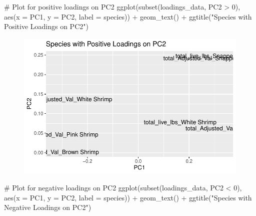 \documentclass[
  letterpaper,
  DIV=11,
  numbers=noendperiod]{scrartcl}
\newenvironment{Shaded}{\begin{snugshade}}{\end{snugshade}}
\newcommand{\AttributeTok}[1]{\textcolor[rgb]{0.40,0.45,0.13}{#1}}
\newcommand{\CommentTok}[1]{\textcolor[rgb]{0.37,0.37,0.37}{#1}}
\newcommand{\DecValTok}[1]{\textcolor[rgb]{0.68,0.00,0.00}{#1}}
\newcommand{\FunctionTok}[1]{\textcolor[rgb]{0.28,0.35,0.67}{#1}}
\newcommand{\NormalTok}[1]{\textcolor[rgb]{0.00,0.23,0.31}{#1}}
\newcommand{\SpecialCharTok}[1]{\textcolor[rgb]{0.37,0.37,0.37}{#1}}
\newcommand{\StringTok}[1]{\textcolor[rgb]{0.13,0.47,0.30}{#1}}
\begin{document}
\begin{Shaded}
\begin{Highlighting}[]
\CommentTok{\# Plot for positive loadings on PC2}
\FunctionTok{ggplot}\NormalTok{(}\FunctionTok{subset}\NormalTok{(loadings\_data, PC2 }\SpecialCharTok{\textgreater{}} \DecValTok{0}\NormalTok{), }\FunctionTok{aes}\NormalTok{(}\AttributeTok{x =}\NormalTok{ PC1, }\AttributeTok{y =}\NormalTok{ PC2, }\AttributeTok{label =}\NormalTok{ species)) }\SpecialCharTok{+}
  \FunctionTok{geom\_text}\NormalTok{() }\SpecialCharTok{+}
  \FunctionTok{ggtitle}\NormalTok{(}\StringTok{"Species with Positive Loadings on PC2"}\NormalTok{)}
\end{Highlighting}
\end{Shaded}

\begin{figure}[H]

{\centering \includegraphics{PCA_all_data_files/figure-pdf/unnamed-chunk-8-3.pdf}

}

\end{figure}

\begin{Shaded}
\begin{Highlighting}[]
\CommentTok{\# Plot for negative loadings on PC2}
\FunctionTok{ggplot}\NormalTok{(}\FunctionTok{subset}\NormalTok{(loadings\_data, PC2 }\SpecialCharTok{\textless{}} \DecValTok{0}\NormalTok{), }\FunctionTok{aes}\NormalTok{(}\AttributeTok{x =}\NormalTok{ PC1, }\AttributeTok{y =}\NormalTok{ PC2, }\AttributeTok{label =}\NormalTok{ species)) }\SpecialCharTok{+}
  \FunctionTok{geom\_text}\NormalTok{() }\SpecialCharTok{+}
  \FunctionTok{ggtitle}\NormalTok{(}\StringTok{"Species with Negative Loadings on PC2"}\NormalTok{)}
\end{Highlighting}
\end{Shaded}
\end{document}
